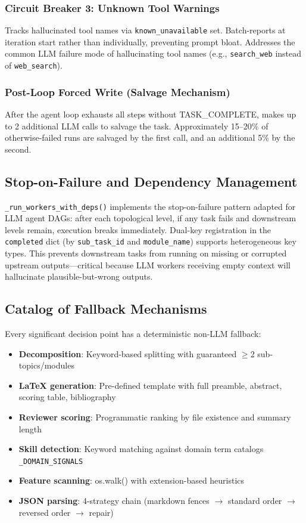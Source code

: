\subsubsection{Circuit Breaker 3: Unknown Tool Warnings}

Tracks hallucinated tool names via \texttt{known\_unavailable} set. Batch-reports at iteration start rather than individually, preventing prompt bloat. Addresses the common LLM failure mode of hallucinating tool names (e.g., \texttt{search\_web} instead of \texttt{web\_search}).

\subsubsection{Post-Loop Forced Write (Salvage Mechanism)}

After the agent loop exhausts all steps without TASK\_COMPLETE, makes up to 2 additional LLM calls to salvage the task. Approximately 15--20\% of otherwise-failed runs are salvaged by the first call, and an additional 5\% by the second.

\subsection{Stop-on-Failure and Dependency Management}

\texttt{\_run\_workers\_with\_deps()} implements the stop-on-failure pattern adapted for LLM agent DAGs: after each topological level, if any task fails and downstream levels remain, execution breaks immediately. Dual-key registration in the \texttt{completed} dict (by \texttt{sub\_task\_id} and \texttt{module\_name}) supports heterogeneous key types. This prevents downstream tasks from running on missing or corrupted upstream outputs---critical because LLM workers receiving empty context will hallucinate plausible-but-wrong outputs.

\subsection{Catalog of Fallback Mechanisms}

Every significant decision point has a deterministic non-LLM fallback:

\begin{itemize}
    \item \textbf{Decomposition}: Keyword-based splitting with guaranteed $\ge$2 sub-topics/modules
    \item \textbf{LaTeX generation}: Pre-defined template with full preamble, abstract, scoring table, bibliography
    \item \textbf{Reviewer scoring}: Programmatic ranking by file existence and summary length
    \item \textbf{Skill detection}: Keyword matching against domain term catalogs \texttt{\_DOMAIN\_SIGNALS}
    \item \textbf{Feature scanning}: os.walk() with extension-based heuristics
    \item \textbf{JSON parsing}: 4-strategy chain (markdown fences $\rightarrow$ standard order $\rightarrow$ reversed order $\rightarrow$ repair)
\end{itemize}

